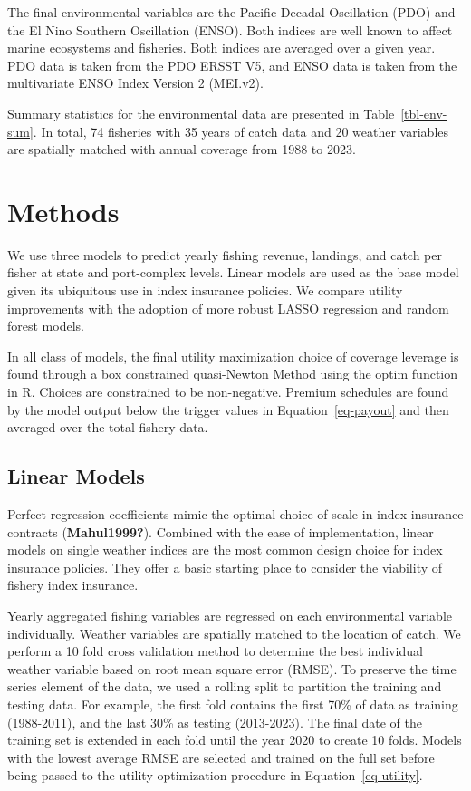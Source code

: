\documentclass[
  letterpaper,
  DIV=11,
  numbers=noendperiod]{scrartcl}
\begin{document}
The final environmental variables are the Pacific Decadal Oscillation
(PDO) and the El Nino Southern Oscillation (ENSO). Both indices are well
known to affect marine ecosystems and fisheries. Both indices are
averaged over a given year. PDO data is taken from the PDO ERSST V5, and
ENSO data is taken from the multivariate ENSO Index Version 2 (MEI.v2).

Summary statistics for the environmental data are presented in
Table~\ref{tbl-env-sum}. In total, 74 fisheries with 35 years of catch
data and 20 weather variables are spatially matched with annual coverage
from 1988 to 2023.

\hypertarget{sec-methods}{%
\section{Methods}\label{sec-methods}}

We use three models to predict yearly fishing revenue, landings, and
catch per fisher at state and port-complex levels. Linear models are
used as the base model given its ubiquitous use in index insurance
policies. We compare utility improvements with the adoption of more
robust LASSO regression and random forest models.

In all class of models, the final utility maximization choice of
coverage leverage is found through a box constrained quasi-Newton Method
using the optim function in R. Choices are constrained to be
non-negative. Premium schedules are found by the model output below the
trigger values in Equation~\ref{eq-payout} and then averaged over the
total fishery data.

\hypertarget{linear-models}{%
\subsection{Linear Models}\label{linear-models}}

Perfect regression coefficients mimic the optimal choice of scale in
index insurance contracts (\textbf{Mahul1999?}). Combined with the ease
of implementation, linear models on single weather indices are the most
common design choice for index insurance policies. They offer a basic
starting place to consider the viability of fishery index insurance.

Yearly aggregated fishing variables are regressed on each environmental
variable individually. Weather variables are spatially matched to the
location of catch. We perform a 10 fold cross validation method to
determine the best individual weather variable based on root mean square
error (RMSE). To preserve the time series element of the data, we used a
rolling split to partition the training and testing data. For example,
the first fold contains the first 70\% of data as training (1988-2011),
and the last 30\% as testing (2013-2023). The final date of the training
set is extended in each fold until the year 2020 to create 10 folds.
Models with the lowest average RMSE are selected and trained on the full
set before being passed to the utility optimization procedure in
Equation~\ref{eq-utility}.
\end{document}
